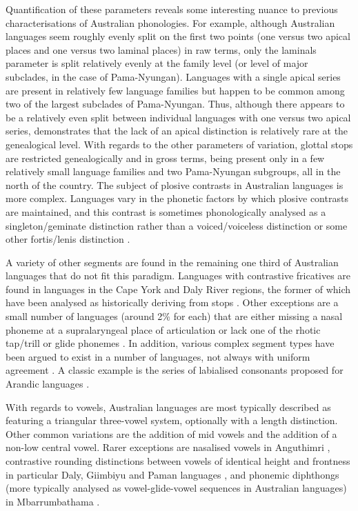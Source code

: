 Quantification of these parameters reveals some interesting nuance to previous characterisations of Australian phonologies. For example, although Australian languages seem roughly evenly split on the first two points (one versus two apical places and one versus two laminal places) in raw terms, only the laminals parameter is split relatively evenly at the family level (or level of major subclades, in the case of Pama-Nyungan). Languages with a single apical series are present in relatively few language families but happen to be common among two of the largest subclades of Pama-Nyungan. Thus, although there appears to be a relatively even split between individual languages with one versus two apical series, \textcite{round_segment_2021} demonstrates that the lack of an apical distinction is relatively rare at the genealogical level. With regards to the other parameters of variation, glottal stops are restricted genealogically and in gross terms, being present only in a few relatively small language families and two Pama-Nyungan subgroups, all in the north of the country. The subject of plosive contrasts in Australian languages is more complex. Languages vary in the phonetic factors by which plosive contrasts are maintained, and this contrast is sometimes phonologically analysed as a singleton/geminate distinction rather than a voiced/voiceless distinction or some other fortis/lenis distinction \autocite[for a more detailed overview, see][]{round_segment_2021}.

A variety of other segments are found in the remaining one third of Australian languages that do not fit this paradigm. Languages with contrastive fricatives are found in languages in the Cape York and Daly River regions, the former of which have been analysed as historically deriving from stops \autocite[p.~199]{dixon_languages_1980}. Other exceptions are a small number of languages (around 2\% for each) that are either missing a nasal phoneme at a supralaryngeal place of articulation or lack one of the rhotic tap/trill or glide phonemes \autocite{round_segment_2021}. In addition, various complex segment types have been argued to exist in a number of languages, not always with uniform agreement \autocite[see][]{round_segment_2021}. A classic example is the series of labialised consonants proposed for Arandic languages \autocites{wilkins_mparntwe_1989}{breen_wonders_2001}.

With regards to vowels, Australian languages are most typically described as featuring a triangular three-vowel system, optionally with a length distinction. Other common variations are the addition of mid vowels and the addition of a non-low central vowel. Rarer exceptions are nasalised vowels in Anguthimri \autocite{crowley_mpakwithi_1981}, contrastive rounding distinctions between vowels of identical height and frontness in particular Daly, Giimbiyu and Paman languages \autocite{round_segment_2021}, and phonemic diphthongs (more typically analysed as vowel-glide-vowel sequences in Australian languages) in Mbarrumbathama \autocite{verstraete_mbarrumbathama_2019}.

